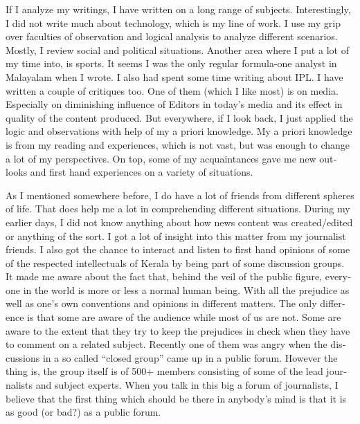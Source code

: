 \begin{english}
If I analyze my writings, I have written on a long range of subjects. Interestingly, I did not write much about technology, which is my line of work. I use my grip over faculties of observation and logical analysis to analyze different scenarios. Mostly, I review social and political situations. Another area where I put a lot of my time into, is sports. It seems I was the only regular formula-one analyst in Malayalam when I wrote. I also had spent some time writing about IPL. I have written a couple of critiques too. One of them (which I like most) is on media. Especially on diminishing influence of Editors in today's media and its effect in quality of the content produced. But everywhere, if I look back, I just applied the logic and observations with help of my a priori knowledge. My a priori knowledge is from my reading and experiences, which is not vast, but was enough to change a lot of my perspectives. On top, some of my acquaintances gave me new outlooks and first hand experiences on a variety of situations. 

As I mentioned somewhere before, I do have a lot of friends from different spheres of life. That does help me a lot in comprehending different situations. During my earlier days, I did not know anything about how news content was created/edited or anything of the sort. I got a lot of insight into this matter from my journalist friends. I also got the chance to interact and listen to first hand opinions of some of the respected intellectuals of Kerala by being part of some discussion groups. It made me aware about the fact that, behind the veil of the public figure, everyone in the world is more or less a normal human being. With all the prejudice as well as one's own conventions and opinions in different matters. The only difference is that some are aware of the audience while most of us are not. Some are aware to the extent that they try to keep the prejudices in check when they have to comment on a related subject. Recently one of them was angry when the discussions in a so called ``closed group'' came up in a public forum. However the thing is, the group itself is of 500+ members consisting of some of the lead journalists and subject experts. When you talk in this big a forum of journalists, I believe that the first thing which should be there in anybody's mind is that it is as good (or bad?) as a public forum.


\end{english}

